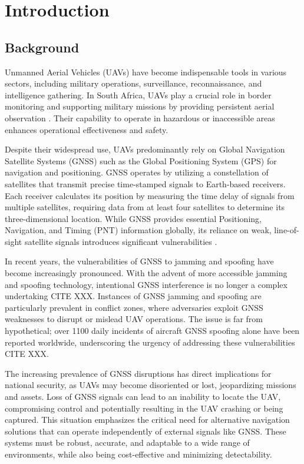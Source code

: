 
\chapter{Introduction}
\label{chap:introduction}




\section{Background}

Unmanned Aerial Vehicles (UAVs) have become indispensable tools in various sectors, including military operations, surveillance, reconnaissance, and intelligence gathering. In South Africa, UAVs play a crucial role in border monitoring and supporting military missions by providing persistent aerial observation \cite{Weiss2024}. Their capability to operate in hazardous or inaccessible areas enhances operational effectiveness and safety.

Despite their widespread use, UAVs predominantly rely on Global Navigation Satellite Systems (GNSS) such as the Global Positioning System (GPS) for navigation and positioning. GNSS operates by utilizing a constellation of satellites that transmit precise time-stamped signals to Earth-based receivers. Each receiver calculates its position by measuring the time delay of signals from multiple satellites, requiring data from at least four satellites to determine its three-dimensional location. While GNSS provides essential Positioning, Navigation, and Timing (PNT) information globally, its reliance on weak, line-of-sight satellite signals introduces significant vulnerabilities \cite{geotab2024gps}.

In recent years, the vulnerabilities of GNSS to jamming and spoofing have become increasingly pronounced. With the advent of more accessible jamming and spoofing technology, intentional GNSS interference is no longer a complex undertaking {CITE XXX}. Instances of GNSS jamming and spoofing are particularly prevalent in conflict zones, where adversaries exploit GNSS weaknesses to disrupt or mislead UAV operations. The issue is far from hypothetical; over 1100 daily incidents of aircraft GNSS spoofing alone have been reported worldwide, underscoring the urgency of addressing these vulnerabilities {CITE XXX}.

The increasing prevalence of GNSS disruptions has direct implications for national security, as UAVs may become disoriented or lost, jeopardizing missions and assets. Loss of GNSS signals can lead to an inability to locate the UAV, compromising control and potentially resulting in the UAV crashing or being captured. This situation emphasizes the critical need for alternative navigation solutions that can operate independently of external signals like GNSS. These systems must be robust, accurate, and adaptable to a wide range of environments, while also being cost-effective and minimizing detectability.

